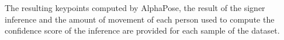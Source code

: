 The resulting keypoints computed by AlphaPose, the result of the signer inference and the amount of movement of each person used to compute the confidence score of the inference are provided for each sample of the dataset.


 



